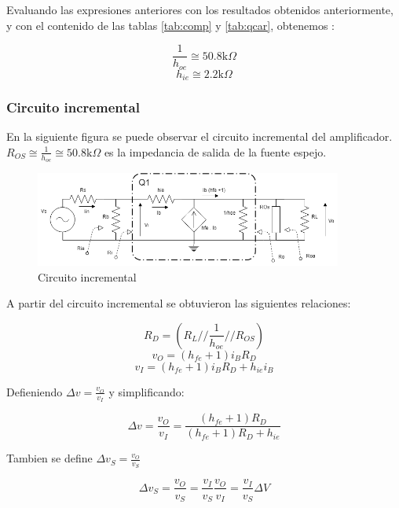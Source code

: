 \documentclass[../../main.tex]{subfiles}
\begin{document}
Evaluando las expresiones anteriores con los resultados obtenidos  anteriormente, y con el contenido de las tablas \ref{tab:comp} y \ref{tab:qcar}, obtenemos :

$$\frac{1}{h_{oe}}\cong 50.8\mathrm{k}\Omega $$
$$ h_{ie}\cong 2.2\mathrm{k}\Omega $$

\subsubsection{Circuito incremental}
En la siguiente figura se puede observar el circuito incremental del amplificador. $R_{OS}\cong \frac{1}{h_{oe}}\cong 50.8\mathrm{k}\Omega  $ es la impedancia de salida de la fuente espejo. 
\begin{figure}[H]	
	\centering
	\includegraphics[width=0.9\textwidth]{imagenes/incr.png}
	\caption{Circuito incremental}
\end{figure}

A partir del circuito incremental se obtuvieron las siguientes relaciones:

\begin{equation}
R_D=\left( R_{L} // \frac{1}{h_{oe}} // R_{OS} \right)
\end{equation}
\begin{equation}
v_{O}=\left( h_{fe} +1 \right) i_{B} R_D
\end{equation}
\begin{equation}
v_{I}=\left( h_{fe} +1 \right) i_{B} R_D + h_{ie} i_{B} \label{eq:ri}
\end{equation}



Defieniendo $\Delta v =\frac{v_O}{v_I}$ y simplificando:

\begin{equation}
\Delta v =\frac{v_O}{v_I}=\frac{\left( h_{fe} +1 \right) R_D}{\left( h_{fe} +1 \right) R_D + h_{ie} }
\end{equation}

Tambien se define  $\Delta v_S =\frac{v_O}{v_S}$

\begin{equation}
\Delta v_S =\frac{v_O}{v_S}=\frac{v_I}{v_S} \frac{v_O}{v_I} =\frac{v_I}{v_S}\Delta V 
\end{equation}
\end{document}
